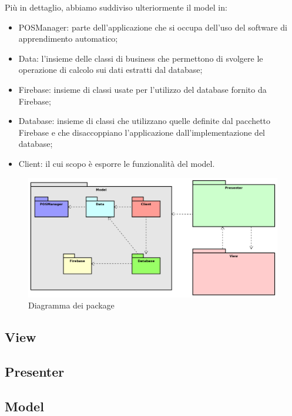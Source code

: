 Più in dettaglio, abbiamo suddiviso ulteriormente il model in:
\begin{itemize}
	\item POSManager: parte dell'applicazione che si occupa dell'uso del software di apprendimento automatico;
	\item Data: l'insieme delle classi di business che permettono di svolgere le operazione di calcolo sui dati estratti dal database;
	\item Firebase: insieme di classi usate per l'utilizzo del database fornito da Firebase;
	\item Database: insieme di classi che utilizzano quelle definite dal pacchetto Firebase e che disaccoppiano l'applicazione dall'implementazione del database;
	\item Client: il cui scopo è esporre le funzionalità del model.
\end{itemize}
\begin{figure}[h]
	\includegraphics[scale=0.5]{images/package.png}
	\caption{Diagramma dei package}
\end{figure}


\newpage
\subsection{View}

\newpage
\subsection{Presenter}

\newpage
\subsection{Model}

\newpage